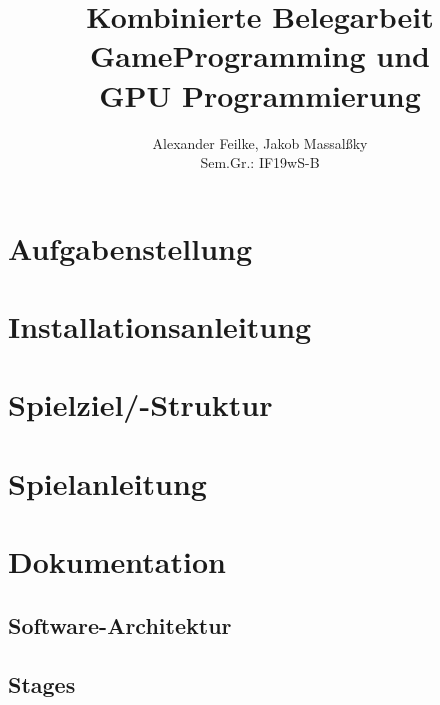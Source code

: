 \documentclass[a4paper,10pt,ngerman,fontsize=12pt]{scrreprt}
\title{Kombinierte Belegarbeit \\ GameProgramming und \\ GPU Programmierung}
\author{Alexander Feilke, Jakob Massal{\ss}ky \\ Sem.Gr.: IF19wS-B}
\begin{document}
\normalfont

\maketitle
\newpage %

\renewcommand{\contentsname}{Inhaltsverzeichnis}
\tableofcontents  %
\newpage


\sloppy
\flushbottom



\chapter{Aufgabenstellung}
\lipsum[3]




\chapter{Installationsanleitung}
\lipsum[3]




\chapter{Spielziel/-Struktur}
\lipsum[3]




\chapter{Spielanleitung}
\lipsum[3]





\chapter{Dokumentation}
\lipsum[3]




\section{Software-Architektur}
\lipsum[3]



\section{Stages}
\lipsum[3]
\end{document}
